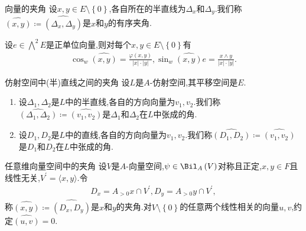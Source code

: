 \begin{definition}{向量的夹角}{}
	设$x,y\in E\setminus\left\{0\right\}$,各自所在的半直线为$\Delta_{x}$和$\Delta_{y}$.我们称$\widehat{\left(x,y\right)}\coloneq\widehat{\left(\Delta_{x},\Delta_{y}\right)}$是$x$和$y$的有序夹角.
\end{definition}

\begin{proposition}{}{}
	设$e\in\bigwedge\limits^{2}E$是正单位向量,则对每个$x,y\in E\setminus\left\{0\right\}$有
	\begin{align*}
		\cos_{w}\widehat{\left(x,y\right)}=\frac{\varphi\left(x,y\right)}{\left|x\right|\cdot\left|y\right|},\sin_{w}\widehat{\left(x,y\right)}e=\frac{x\wedge y}{\left|x\right|\cdot\left|y\right|}.
	\end{align*}
\end{proposition}

\begin{definition}{仿射空间中(半)直线之间的夹角}{}
	设$L$是$A$-仿射空间,其平移空间是$E$.
	\begin{enumerate}
		\item 设$\Delta_{1},\Delta_{2}$是$L$中的半直线,各自的方向向量为$v_{1},v_{2}$.我们称$\widehat{\left(\Delta_{1},\Delta_{2}\right)}\coloneq\widehat{\left(v_{1},v_{2}\right)}$是$\Delta_{1}$和$\Delta_{2}$在$L$中张成的角.
		\item 设$D_{1},D_{2}$是$L$中的直线,各自的方向向量为$v_{1},v_{2}$.我们称$\widehat{\left(D_{1},D_{2}\right)}\coloneq\widehat{\left(v_{1},v_{2}\right)}$是$D_{1}$和$D_{2}$在$L$中张成的角.
	\end{enumerate}
\end{definition}

\begin{definition}{任意维向量空间中的夹角}{}
	设$V$是$A$-向量空间,$\psi\in\Bil_{A}\left(V\right)$对称且正定,$x,y\in F$且线性无关,$V^{\prime}=\langle x,y\rangle$.令
	\begin{align*}
		D_{x}=A_{>0}x\cap V^{\prime},D_{y}=A_{>0}y\cap V^{\prime},
	\end{align*}
	称$\widehat{\left(x,y\right)}\coloneq\widehat{\left(D_{x},D_{y}\right)}$是$x$和$y$的夹角.对$V\setminus\left\{0\right\}$的任意两个线性相关的向量$u,v$,约定$\widehat{\left(u,v\right)}=0$.
\end{definition}

